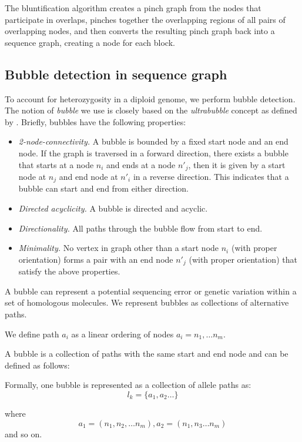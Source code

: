 The bluntification algorithm creates a pinch graph from the nodes that participate in overlaps, pinches together the overlapping regions of all pairs of overlapping nodes, and then converts the resulting pinch graph back into a sequence graph, creating a node for each block.


\subsection{Bubble detection in sequence graph} To account for heterozygosity in a diploid genome, we perform bubble detection. The notion of \textit{bubble} we use is closely based on the \textit{ultrabubble} concept as defined by \cite{paten2017superbubbles}. Briefly, bubbles have the following properties:
\begin{itemize}
 \item \textit{2-node-connectivity.} A bubble is bounded by a fixed start node and an end node. If the graph is traversed in a forward direction, there exists a bubble that starts at a node $n_i$  and ends at a node $n'_j$, then it is given by a start node at $n_j$ and end node at $n'_i$ in a reverse direction. 
 This indicates that a bubble can start and end from either direction.
 \item \textit{Directed acyclicity.} A bubble is directed and acyclic.
 \item \textit{Directionality.} All paths through the bubble flow from start to end.
 \item \textit{Minimality.} No vertex in graph other than a start node $n_i$ (with proper orientation) forms a pair with an end node $n'_j$ (with proper orientation) that satisfy the above properties. 
\end{itemize}

A bubble can represent a potential sequencing error or genetic variation within a set of homologous molecules.
We represent bubbles as collections of alternative paths.

\begin{definition}[Path] We define path $a_i$ as a linear ordering of nodes $a_i= n_1, \ldots n_m$. 
\label{def:allele-path}
\end{definition}

A bubble is a collection of paths with the same start and end node and can be defined as follows:
\begin{definition}[Bubble]
Formally, one bubble is represented as a collection of allele paths as:
 \[l_k= \{a_1,a_2 \ldots\}\]
 
 where 
 \[a_1=(n_1, n_2, \ldots n_m), a_2=(n_1, n_3 \ldots n_m)\] and so on. 
\end{definition}


